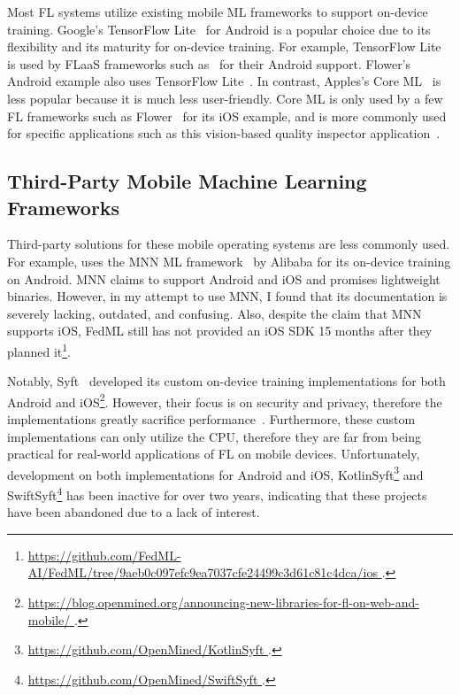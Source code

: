 \documentclass[conference]{IEEEtran}
\begin{document}
Most FL systems utilize existing mobile ML frameworks to
support on-device training.
Google's TensorFlow Lite~\cite{tensorflow2015-whitepaper,abadi2016tensorflow}
for Android is
a popular choice due to its flexibility and
its maturity for on-device training.
For example, TensorFlow Lite is used by FLaaS frameworks such as~\cite{
    kourtellis2020flaas,katevas2022flaas}
for their Android support.
Flower's Android example also uses
TensorFlow Lite~\cite{beutel2020flower,mathur2021ondevice}.
In contrast, Apples's Core ML~\cite{coreml} is less popular because
it is much less user-friendly.
Core ML is only used by a few FL frameworks such as
Flower~\cite{beutel2020flower} for its iOS example,
and is more commonly used for specific applications
such as this vision-based quality inspector application~\cite{bharti2022edge}.

\subsection{Third-Party Mobile Machine Learning Frameworks}

Third-party solutions for these mobile operating systems are less commonly used.
For example, \FedML{} uses
the MNN ML framework~\cite{jiang2020mnn,lv2022walle} by Alibaba for
its on-device training on Android.
MNN claims to support Android and iOS and promises lightweight binaries.
However, in my attempt to use MNN, I found that its documentation is
severely lacking, outdated, and confusing.
Also, despite the claim that MNN supports iOS,
FedML still has not provided an iOS SDK 15 months after they planned
it\footnote{\url{
    https://github.com/FedML-AI/FedML/tree/9aeb0c097efc9ea7037cfe24499c3d61c81c4dca/ios
}.}.

Notably, Syft~\cite{ryffel2018generic,Ziller2021,hall2021syft} developed
its custom on-device training implementations for
both Android and iOS\footnote{\url{
    https://blog.openmined.org/announcing-new-libraries-for-fl-on-web-and-mobile/
}.}.
However, their focus is on security and privacy,
therefore the implementations greatly sacrifice
performance~\cite{ryffel2018generic}.
Furthermore, these custom implementations can only utilize the CPU,
therefore they are far from being practical for real-world applications of
FL on mobile devices.
Unfortunately, development on
both implementations for Android and iOS,
KotlinSyft\footnote{\url{
    https://github.com/OpenMined/KotlinSyft
}.} and SwiftSyft\footnote{\url{
    https://github.com/OpenMined/SwiftSyft
}.} has been inactive for over two years,
indicating that these projects have been abandoned due to a lack of interest.
\end{document}
